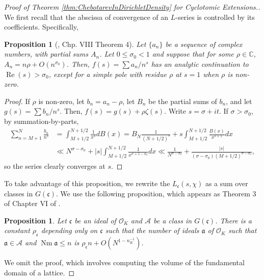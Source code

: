 \documentclass[12pt]{amsart}
\newtheorem{prop}[thm]{Proposition}
\theoremstyle{definition}
\theoremstyle{remark}
\numberwithin{equation}{section}
\newcommand{\sA}{\mathscr A}
\newcommand{\cO}{\mathcal O}
\newcommand{\fka}{\mathfrak a}
\newcommand{\fkc}{\mathfrak c}
\newcommand{\bbC}{\mathbb C}
\DeclareMathOperator{\norm}{Nm}
\DeclareMathOperator{\re}{Re}
\newcommand{\inv}{^{-1}}
\begin{document}
\begin{proof}[Proof of Theorem \ref{thm:ChebotarevInDirichletDensity} for Cyclotomic Extensions.]
We first recall that the abscissa of convergence of an $L$-series is controlled by its coefficients. Specifically,
\begin{prop}[\cite{Lang86}, Chp. VIII Theorem 4]\label{prop:WhereDoesItConverge}
Let $\{a_{n}\}$ be a sequence of complex numbers, with partial sums $A_{n}$. Let $0 \leq \sigma_0 < 1$ and suppose that for some $\rho \in \bbC$, $A_{n} = n \rho + O(n^{\sigma_{0}})$. Then, $f(s) = \sum a_{n}/n^s$ has an analytic continuation to $\re(s) > \sigma_{0}$, except for a simple pole with residue $\rho$ at $s = 1$ when $\rho$ is non-zero.
\end{prop}
\begin{proof}
If $\rho$ is non-zero, let $b_{n} = a_{n} - \rho$, let $B_{n}$ be the partial sums of $b_{n}$, and let $g(s) = \sum b_{n}/n^s$. Then, $f(s) = g(s) + \rho \zeta(s)$. Write $s = \sigma + it$. If $\sigma > \sigma_{0}$, by summation-by-parts, 
\begin{align*}
\sum_{n = M+1}^{N} \frac{b_{n}}{n^{s}} & = \int_{M+1/2}^{N+1/2} \frac{1}{x^{s}} dB(x) =  B_{N}\frac{1}{(N+1/2)^s} + s  \int_{M+1/2}^{N+1/2} \frac{B(x)}{x^{s+1}} dx \\
  & \ll
  N^{\sigma - \sigma_{0}} + |s| \int_{M+1/2}^{N+1/2} \frac{1}{x^{\sigma + 1 - \sigma_{0}}} dx \ll \frac{1}{N^{\sigma - \sigma_{0}}} + \frac{|s|}{(\sigma - \sigma_{0})(M + 1/2)^{\sigma - \sigma_{0}}},
\end{align*}
so the series clearly converges at $s$.
\end{proof}
To take advantage of this proposition, we rewrite the $L_{\fkc}(s,\chi)$ as a sum over classes in $G(\fkc)$.  We use the following proposition, which appears as Theorem 3 of Chapter VI of \cite{Lang86}.
\begin{prop}
Let $\fkc$ be an ideal of $\cO_{K}$ and $\sA$ be a class in $G(\fkc)$. There is a constant $\rho_{\fkc}$ depending only on $\fkc$ such that the number of ideals $\fka$ of $\cO_{K}$ such that $\fka \in \sA$ and $\norm \fka \leq n$ is $\rho_{\fkc}n + O(N^{1-n_{K}\inv})$. 
\end{prop}
We omit the proof, which involves computing the volume of the fundamental domain of a lattice.


\end{proof}
\end{document}
